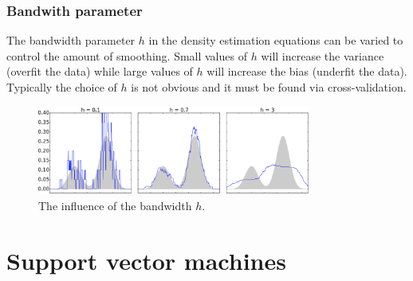 \documentclass[CS5104-Notes.tex]{subfiles}
\begin{document}
\subsubsection{Bandwith parameter}
The bandwidth parameter $h$ in the density estimation equations can be varied to control the amount of smoothing. Small values of $h$ will increase the variance (overfit the data) while large values of $h$ will increase the bias (underfit the data). Typically the choice of $h$ is not obvious and it must be found via cross-validation.
\begin{figure}[H]
\centering
\includegraphics[width=0.8\textwidth, keepaspectratio]{imgs/bandwidth.png}
\caption{The influence of the bandwidth $h$.}
\end{figure}

\section{Support vector machines}
\end{document}
